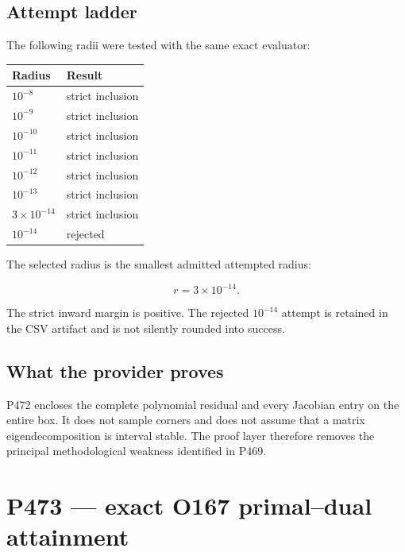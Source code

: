 \documentclass[11pt,a4paper,openany]{report}
\begin{document}
\section{Attempt ladder}

The following radii were tested with the same exact evaluator:

\begin{center}
\begingroup\small
\setlength{\tabcolsep}{2.5pt}
\renewcommand{\arraystretch}{1.16}
\begin{longtable}{@{}p{}p{}@{}}
\toprule
\textbf{Radius} & \textbf{Result} \\
\midrule
\endhead
\(10^{-8}\) & strict inclusion \\
\(10^{-9}\) & strict inclusion \\
\(10^{-10}\) & strict inclusion \\
\(10^{-11}\) & strict inclusion \\
\(10^{-12}\) & strict inclusion \\
\(10^{-13}\) & strict inclusion \\
\(3\times10^{-14}\) & strict inclusion \\
\(10^{-14}\) & rejected \\
\bottomrule
\end{longtable}
\endgroup
\end{center}

The selected radius is the smallest admitted attempted radius:

\[
r=3\times10^{-14}.
\]

The strict inward margin is positive. The rejected \(10^{-14}\) attempt is retained in the CSV artifact and is not silently rounded into success.

\section{What the provider proves}

P472 encloses the complete polynomial residual and every Jacobian entry on the entire box. It does not sample corners and does not assume that a matrix eigendecomposition is interval stable. The proof layer therefore removes the principal methodological weakness identified in P469.

\chapter{P473 --- exact O167 primal--dual attainment}
\end{document}
